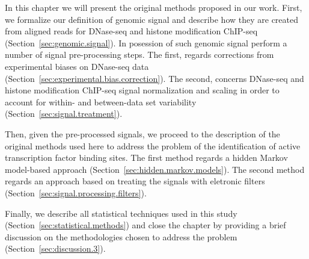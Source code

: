 In this chapter we will present the original methods proposed in our work. First, we formalize our definition of genomic signal and describe how they are created from aligned reads for DNase-seq and histone modification ChIP-seq (Section~\ref{sec:genomic.signal}). In posession of such genomic signal perform a number of signal pre-processing steps. The first, regards corrections from experimental biases on DNase-seq data (Section~\ref{sec:experimental.bias.correction}). The second, concerns DNase-seq and histone modification ChIP-seq signal normalization and scaling in order to account for within- and between-data set variability (Section~\ref{sec:signal.treatment}).

Then, given the pre-processed signals, we proceed to the description of the original methods used here to address the problem of the identification of active transcription factor binding sites. The first method regards a hidden Markov model-based approach (Section~\ref{sec:hidden.markov.models}). The second method regards an approach based on treating the signals with eletronic filters (Section~\ref{sec:signal.processing.filters}).

Finally, we describe all statistical techniques used in this study (Section~\ref{sec:statistical.methods}) and close the chapter by providing a brief discussion on the methodologies chosen to address the problem (Section~\ref{sec:discussion.3}).





